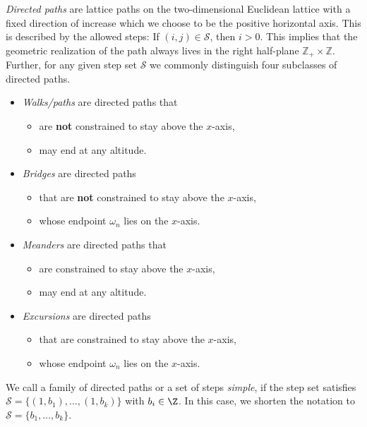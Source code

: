 \begin{definition} 
  \textit{Directed paths} are lattice paths on the two-dimensional Euclidean lattice with a fixed direction of increase which we choose to be the positive horizontal axis. This is described by the allowed steps: If $(i,j) \in \mathcal{S}$, then $i > 0.$ 
  This implies that the geometric realization of the path always lives in the right half-plane $\mathbb{Z}_+ \times \mathbb{Z}$.
  Further, for any given step set $\mathcal{S}$ we commonly distinguish four subclasses of directed paths.
  \begin{itemize}
    \item \textit{Walks/paths} are directed paths that
    \begin{itemize}
      \item are \textbf{not} constrained to stay above the $x$-axis,
      \item may end at any altitude.
    \end{itemize}
    \item \textit{Bridges} are directed paths
    \begin{itemize}
      \item that are \textbf{not} constrained to stay above the $x$-axis,
      \item whose endpoint $\omega_n$ lies on the $x$-axis.
    \end{itemize}
    \item \textit{Meanders} are directed paths that
    \begin{itemize}
      \item are constrained to stay above the $x$-axis,
      \item may end at any altitude.
    \end{itemize}
    \item \textit{Excursions} are directed paths
    \begin{itemize}
      \item that are constrained to stay above the $x$-axis,
      \item whose endpoint $\omega_n$ lies on the $x$-axis.
    \end{itemize}
  \end{itemize}
\end{definition}

\begin{definition} 
  We call a family of directed paths or a set of steps \textit{simple}, if the step set satisfies $\mathcal{S} = \{(1,b_1),\dots,(1,b_k)\}$ with $b_i \in \Z$.
  In this case, we shorten the notation to $\mathcal{S} = \{b_1,\dots,b_k\}$.
\end{definition}

